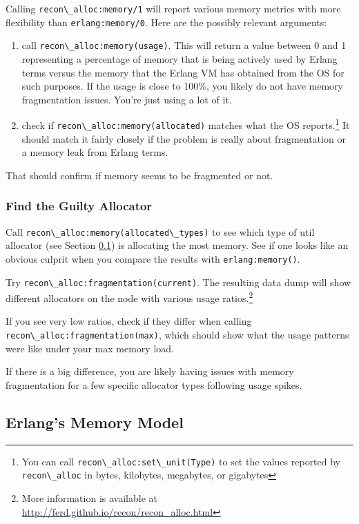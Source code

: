 \documentclass[11pt, oneside]{book}   	%
\newcommand{\module}[1]{\Verb`#1`}
\newcommand{\function}[1]{\Verb`#1`}
\newcommand{\expression}[1]{\Verb`#1`}
\begin{document}
Calling \function{recon\_alloc:memory/1} will report various memory metrics with more flexibility than \function{erlang:memory/0}. Here are the possibly relevant arguments:

\begin{enumerate}
	\item call \expression{recon\_alloc:memory(usage)}. This will return a value between 0 and 1 representing a percentage of memory that is being actively used by Erlang terms versus the memory that the Erlang VM has obtained from the OS for such purposes. If the usage is close to 100\%, you likely do not have memory fragmentation issues. You're just using a lot of it.
	\item check if \expression{recon\_alloc:memory(allocated)} matches what the OS reports.\footnote{You can call \expression{recon\_alloc:set\_unit(Type)} to set the values reported by \module{recon\_alloc} in bytes, kilobytes, megabytes, or gigabytes} It should match it fairly closely if the problem is really about fragmentation or a memory leak from Erlang terms.
\end{enumerate}

That should confirm if memory seems to be fragmented or not.

\subsubsection{Find the Guilty Allocator}

Call \expression{recon\_alloc:memory(allocated\_types)} to see which type of util allocator (see Section \ref{subsec:erlang-memory-model}) is allocating the most memory. See if one looks like an obvious culprit when you compare the results with \expression{erlang:memory()}.

Try \expression{recon\_alloc:fragmentation(current)}. The resulting data dump will show different allocators on the node with various usage ratios.\footnote{More information is available at \href{http://ferd.github.io/recon/recon\_alloc.html}{http://ferd.github.io/recon/recon\_alloc.html}}

If you see very low ratios, check if they differ when calling \expression{recon\_alloc:fragmentation(max)}, which should show what the usage patterns were like under your max memory load.

If there is a big difference, you are likely having issues with memory fragmentation for a few specific allocator types following usage spikes.

\subsection{Erlang's Memory Model}
\label{subsec:erlang-memory-model}
\end{document}
